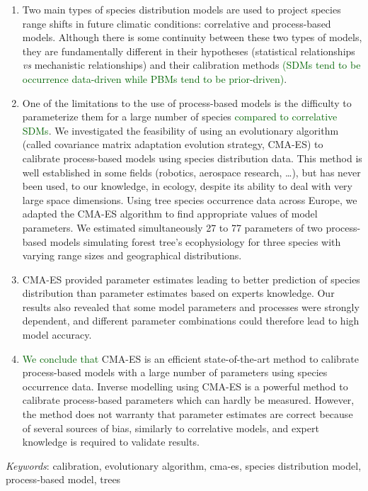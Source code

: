 \documentclass[11pt,]{article}
\renewenvironment{abstract}
 {{%
    \setlength{\leftmargin}{0mm}
    \setlength{\rightmargin}{\leftmargin}%
  }%
  \relax}
 {\endlist}
\begin{document}
\begin{abstract}

    \hbox{\vrule height .2pt width 39.14pc}

    \vskip 8.5pt %

\noindent \begin{enumerate}
\def\labelenumi{\arabic{enumi}.}
\item
  Two main types of species distribution models are used to project
  species range shifts in future climatic conditions: correlative and
  process-based models. Although there is some continuity between these
  two types of models, they are fundamentally different in their
  hypotheses (statistical relationships \emph{vs} mechanistic
  relationships) and their calibration methods
  \textcolor{darkgreen}{(SDMs tend to be occurrence data-driven while PBMs tend to be prior-driven)}.
\item
  One of the limitations to the use of process-based models is the
  difficulty to parameterize them for a large number of species
  \textcolor{darkgreen}{compared to correlative SDMs}. We investigated
  the feasibility of using an evolutionary algorithm (called covariance
  matrix adaptation evolution strategy, CMA-ES) to calibrate
  process-based models using species distribution data. This method is
  well established in some fields (robotics, aerospace research,
  \ldots), but has never been used, to our knowledge, in ecology,
  despite its ability to deal with very large space dimensions. Using
  tree species occurrence data across Europe, we adapted the CMA-ES
  algorithm to find appropriate values of model parameters. We estimated
  simultaneously 27 to 77 parameters of two process-based models
  simulating forest tree's ecophysiology for three species with varying
  range sizes and geographical distributions.
\item
  CMA-ES provided parameter estimates leading to better prediction of
  species distribution than parameter estimates based on experts
  knowledge. Our results also revealed that some model parameters and
  processes were strongly dependent, and different parameter
  combinations could therefore lead to high model accuracy.
\item
  \textcolor{darkgreen}{We conclude that} CMA-ES is an efficient
  state-of-the-art method to calibrate process-based models with a large
  number of parameters using species occurrence data. Inverse modelling
  using CMA-ES is a powerful method to calibrate process-based
  parameters which can hardly be measured. However, the method does not
  warranty that parameter estimates are correct because of several
  sources of bias, similarly to correlative models, and expert knowledge
  is required to validate results.
\end{enumerate}


\vskip 8.5pt \noindent \emph{Keywords}: calibration, evolutionary
algorithm, cma-es, species distribution model, process-based model,
trees \par

    \hbox{\vrule height .2pt width 39.14pc}



\end{abstract}
\end{document}
